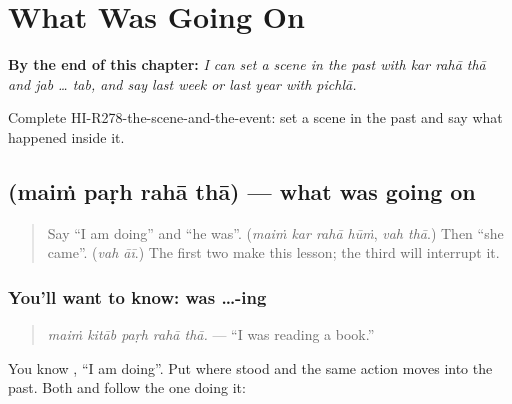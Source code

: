 
\chapter{What Was Going On}
\label{ch:hi-what-was-going-on}

\begin{chapteropening}
\textbf{By the end of this chapter:} \emph{I can set a scene in the past with kar rahā thā and jab … tab, and say last week or last year with pichlā.}

Complete HI-R278-the-scene-and-the-event: set a scene in the past and say what happened inside it.
\end{chapteropening}

\section[\texorpdfstring{\hi{मैं} \hi{पढ़} \hi{रहा} \hi{था} (maiṁ paṛh rahā thā)}{मैं पढ़ रहा था (maiṁ paṛh rahā thā)}]{    (maiṁ paṛh rahā thā) — what was going on}

\label{lesson:HI-C278-padhrahatha}



\begin{quote}
Say \textquotedblleft{}I am doing\textquotedblright{} and \textquotedblleft{}he was\textquotedblright{}. (\emph{maiṁ kar rahā hūṁ}, \emph{vah thā}.) Then \textquotedblleft{}she came\textquotedblright{}. (\emph{vah āī}.) The first two make this lesson; the third will interrupt it.
\end{quote}

\subsection*{You'll want to know: was …-ing}
\begin{quote}
\textbf{    }
\end{quote}

\begin{quote}
\emph{maiṁ kitāb paṛh rahā thā.} — \textquotedblleft{}I was reading a book.\textquotedblright{}
\end{quote}

You know \textbf{  }, \textquotedblleft{}I am doing\textquotedblright{}. Put \textbf{} where \textbf{} stood and the same action moves into the past. Both \textbf{} and \textbf{} follow the one doing it:

